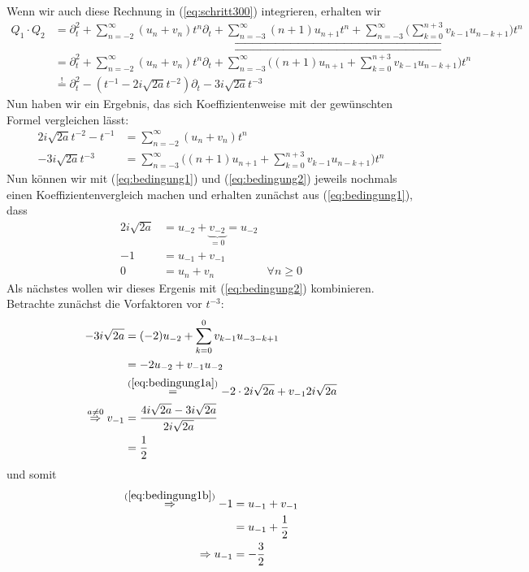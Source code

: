 Wenn wir auch diese Rechnung in (\ref{eq:schritt300}) integrieren, erhalten wir
\begin{align*} \label{eq:schritt400}
Q_1\cdot Q_2&=\partial_t^2 + \sum_{n=-2}^\infty (u_n+v_n)t^n \partial_t
  + \underbracket{\sum_{n=-3}^\infty (n+1)u_{n+1}t^{n}
  + \sum_{n=-3}^\infty \Big( \sum_{k=0}^{n+3} v_{k-1}u_{n-k+1} \Big) t^{n}}
\\&=\partial_t^2 + \sum_{n=-2}^\infty (u_n+v_n)t^n \partial_t
  + \overbracket{\sum_{n=-3}^\infty
  \Big( (n+1)u_{n+1} + \sum_{k=0}^{n+3} v_{k-1}u_{n-k+1} \Big) t^{n}}
\\&\overset{!}{=} \partial_t^2 - (t^{-1} - 2i\sqrt{2a}t^{-2})\partial_t
  - 3 i\sqrt{2a}t^{-3}
\end{align*}
Nun haben wir ein Ergebnis, das sich Koeffizientenweise mit der gewünschten
Formel vergleichen lässt:
\begin{align}
\label{eq:bedingung1}
2i\sqrt{2a}t^{-2} - t^{-1} &= \sum_{n=-2}^\infty (u_n+v_n)t^n
\\
\label{eq:bedingung2}
- 3 i\sqrt{2a}t^{-3} &= \sum_{n=-3}^\infty
  \Big( (n+1)u_{n+1} + \sum_{k=0}^{n+3} v_{k-1}u_{n-k+1} \Big) t^{n}
\end{align}
Nun können wir mit (\ref{eq:bedingung1}) und (\ref{eq:bedingung2}) jeweils
nochmals einen Koeffizientenvergleich machen und erhalten zunächst aus
(\ref{eq:bedingung1}), dass
\begin{align}
2i\sqrt{2a} &= u_{-2} + \underset{=0}{\underbrace{v_{-2}}} = u_{-2}
\label{eq:bedingung1a}
\\-1 &= u_{-1} + v_{-1}
\label{eq:bedingung1b}
\\0 &= u_n + v_n & \forall n \geq 0
\label{eq:bedingung1c}
\end{align}
Als nächstes wollen wir dieses Ergenis mit (\ref{eq:bedingung2}) kombinieren.
Betrachte zunächst die Vorfaktoren vor $t^{-3}$:
\begin{align*}
- 3 i\sqrt{2a} &= (-2)u_{-2} + \sum_{k=0}^{0} v_{k-1}u_{-3-k+1}
\\&= -2u_{-2} + v_{-1}u_{-2}
\\&\overset{(\ref{eq:bedingung1a})}{=} -2\cdot2i\sqrt{2a} + v_{-1}2i\sqrt{2a}
\\\overset{a\neq0}{\Rightarrow} v_{-1}
  &= \frac{4i\sqrt{2a}-3i\sqrt{2a}}{2i\sqrt{2a}}
\\&= \frac{1}{2}
\end{align*}
und somit
\begin{align*}
\overset{(\ref{eq:bedingung1b})}{\Rightarrow} -1 &=u_{-1}+v_{-1}
\\ &=u_{-1}+\frac{1}{2}
\\\Rightarrow u_{-1}&=-\frac{3}{2}
\end{align*}

